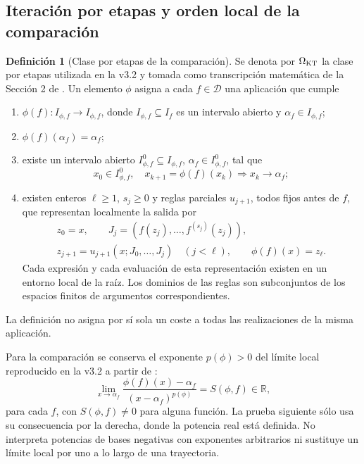 \documentclass[11pt,a4paper]{article}
\numberwithin{equation}{section}
\theoremstyle{definition}
\newtheorem{definition}[theorem]{Definición}
\theoremstyle{remark}
\newcommand{\R}{\mathbb R}
\newcommand{\DD}{\mathcal D}
\begin{document}
\subsection{Iteración por etapas y orden local de la comparación}
\begin{definition}[Clase por etapas de la comparación]\label{def:KTclass}
Se denota por $\Omega_{\rm KT}$ la clase por etapas utilizada en la v3.2 y tomada como transcripción matemática de la Sección 2 de \cite{KT1974}. Un elemento $\phi$ asigna a cada $f\in\DD$ una aplicación que cumple
\begin{enumerate}[label=(\roman*)]
\item $\phi(f):I_{\phi,f}\to I_{\phi,f}$, donde $I_{\phi,f}\subseteq I_f$ es un intervalo abierto y $\alpha_f\in I_{\phi,f}$;
\item $\phi(f)(\alpha_f)=\alpha_f$;
\item existe un intervalo abierto $I^0_{\phi,f}\subseteq I_{\phi,f}$, $\alpha_f\in I^0_{\phi,f}$, tal que
\[
x_0\in I^0_{\phi,f},\quad x_{k+1}=\phi(f)(x_k)
\Longrightarrow x_k\longrightarrow\alpha_f;
\]
\item existen enteros $\ell\ge1$, $s_j\ge0$ y reglas parciales $u_{j+1}$, todos fijos antes de $f$, que representan localmente la salida por
\begin{equation}\label{eq:KTstages}
\begin{gathered}
z_0=x,\qquad J_j=(f(z_j),\ldots,f^{(s_j)}(z_j)),\\
z_{j+1}=u_{j+1}(x;J_0,\ldots,J_j)\quad(j<\ell),\qquad
\phi(f)(x)=z_\ell.
\end{gathered}
\end{equation}
Cada expresión y cada evaluación de esta representación existen en un entorno local de la raíz. Los dominios de las reglas son subconjuntos de los espacios finitos de argumentos correspondientes.
\end{enumerate}
La definición no asigna por sí sola un coste a todas las realizaciones de la misma aplicación.
\end{definition}

Para la comparación se conserva el exponente $p(\phi)>0$ del límite local reproducido en la v3.2 a partir de \cite[p.~644]{KT1974}:
\begin{equation}\label{eq:KTorder}
\lim_{x\to\alpha_f}\frac{\phi(f)(x)-\alpha_f}{(x-\alpha_f)^{p(\phi)}}=S(\phi,f)\in\R,
\end{equation}
para cada $f$, con $S(\phi,f)\ne0$ para alguna función. La prueba siguiente sólo usa su consecuencia por la derecha, donde la potencia real está definida. No interpreta potencias de bases negativas con exponentes arbitrarios ni sustituye un límite local por uno a lo largo de una trayectoria.
\end{document}
